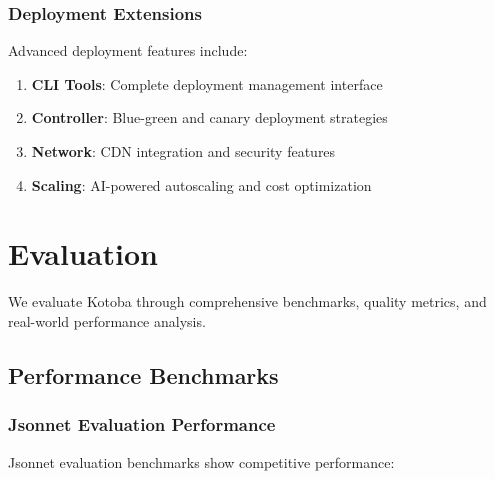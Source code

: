 \documentclass[11pt,a4paper]{article}
\begin{document}
\subsubsection{Deployment Extensions}
\label{subsubsec:deployment_extensions}

Advanced deployment features include:

\begin{enumerate}
\item \textbf{CLI Tools}: Complete deployment management interface
\item \textbf{Controller}: Blue-green and canary deployment strategies
\item \textbf{Network}: CDN integration and security features
\item \textbf{Scaling}: AI-powered autoscaling and cost optimization
\end{enumerate}

\section{Evaluation}
\label{sec:evaluation}

We evaluate Kotoba through comprehensive benchmarks, quality metrics, and real-world performance analysis.

\subsection{Performance Benchmarks}
\label{subsec:performance}

\subsubsection{Jsonnet Evaluation Performance}
\label{subsubsec:jsonnet_bench}

Jsonnet evaluation benchmarks show competitive performance:
\end{document}
